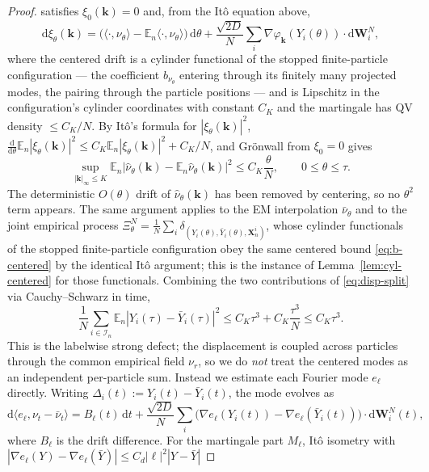 \documentclass[a4paper,fleqn]{cas-sc}
\theoremstyle{definition}
\theoremstyle{remark}
\begin{document}
\begin{proof}
satisfies $\xi_0(\mathbf k)=0$ and, from the It\^o equation above,
\[
\mathrm d\xi_\theta(\mathbf k)
=\bigl(\langle\cdot,\nu_\theta\rangle-\mathbb E_n\langle\cdot,\nu_\theta\rangle\bigr)\,\mathrm d\theta
+\frac{\sqrt{2D}}N\sum_i\nabla\varphi_{\mathbf k}(Y_i(\theta))\!\cdot\!\mathrm d\mathbf W^N_i,
\]
where the centered drift is a cylinder functional of the stopped finite-particle
configuration --- the coefficient $b_{\nu_\theta}$ entering through its finitely many
projected modes, the pairing through the particle positions --- and is Lipschitz in the
configuration's cylinder coordinates with constant
$C_K$ and the martingale has QV density $\le C_K/N$. By It\^o's formula for
$|\xi_\theta(\mathbf k)|^2$, $\frac{\mathrm d}{\mathrm d\theta}
\mathbb E_n|\xi_\theta(\mathbf k)|^2\le C_K\mathbb E_n|\xi_\theta(\mathbf k)|^2+C_K/N$,
and Gr\"onwall from $\xi_0=0$ gives
\begin{equation}\label{eq:b-centered}
\sup_{|\mathbf k|_\infty\le K}\mathbb E_n|\hat\nu_\theta(\mathbf k)-\mathbb E_n\hat\nu_\theta(\mathbf k)|^2
\le C_K\frac\theta N,
\qquad 0\le\theta\le\tau.
\end{equation}
The deterministic $O(\theta)$ drift of $\hat\nu_\theta(\mathbf k)$ has been
removed by centering, so no $\theta^2$ term appears. The same argument applies to
the EM interpolation $\bar\nu_\theta$ and to the joint empirical process
$\Xi^N_\theta=\frac1N\sum_i\delta_{(Y_i(\theta),\bar Y_i(\theta),\mathbf X^i_n)}$,
whose cylinder functionals of the stopped finite-particle configuration obey the same centered bound
\eqref{eq:b-centered} by the identical It\^o argument; this is the instance of
Lemma~\ref{lem:cyl-centered} for those functionals.
Combining the two contributions of \eqref{eq:disp-split} via Cauchy--Schwarz in
time,
\[
\frac1N\sum_{i\in\mathcal I_n}\mathbb E_n|Y_i(\tau)-\bar Y_i(\tau)|^2
\le C_K\tau^3+C_K\frac{\tau^3}{N}\le C_K\tau^3.
\]
This is the labelwise strong defect; the displacement is coupled across particles
through the common empirical field $\nu_r$, so we do \emph{not} treat the centered
modes as an independent per-particle sum. Instead we estimate each Fourier mode
$e_\ell$ directly. Writing $\Delta_i(t):=Y_i(t)-\bar Y_i(t)$, the mode evolves as
\[
\mathrm d\langle e_\ell,\nu_t-\bar\nu_t\rangle
=B_\ell(t)\,\mathrm dt
+\frac{\sqrt{2D}}N\sum_{i}\bigl(\nabla e_\ell(Y_i(t))-\nabla e_\ell(\bar Y_i(t))\bigr)\!\cdot\!\mathrm d\mathbf W^N_i(t),
\]
where $B_\ell$ is the drift difference. For the martingale part $M_\ell$, It\^o
isometry with $|\nabla e_\ell(Y)-\nabla e_\ell(\bar Y)|\le C_d|\ell|^2|Y-\bar Y|$

\end{proof}
\end{document}
